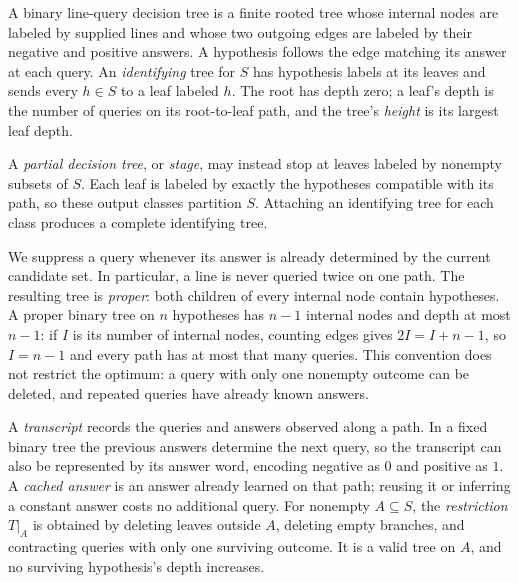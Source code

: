 \begin{definition}\label{def:decision-tree}
A binary line-query decision tree is a finite rooted tree whose
internal nodes are labeled by supplied lines and whose two outgoing
edges are labeled by their negative and positive answers. A
hypothesis follows the edge matching its answer at each query.
An \emph{identifying} tree for $S$ has hypothesis labels at its leaves
and sends every $h\in S$ to a leaf labeled $h$. The root has depth
zero; a leaf's depth is the number of queries on its root-to-leaf path,
and the tree's \emph{height} is its largest leaf depth.

A \emph{partial decision tree}, or \emph{stage}, may instead stop at
leaves labeled by nonempty subsets of $S$. Each leaf is labeled by
exactly the hypotheses compatible with its path, so these output
classes partition $S$. Attaching an identifying tree for each class
produces a complete identifying tree.
\end{definition}

We suppress a query
whenever its answer is already determined by the current candidate
set. In particular, a line is never queried twice on one path.
The resulting tree is \emph{proper}: both children of every internal
node contain hypotheses. A proper binary tree on $n$ hypotheses
has $n-1$ internal nodes and depth at most $n-1$: if $I$ is its
number of internal nodes, counting edges gives $2I=I+n-1$, so
$I=n-1$ and every path has at most that many queries. This convention
does not restrict the optimum: a query with only one nonempty
outcome can be deleted, and repeated queries have already known
answers.

A \emph{transcript} records the queries and answers observed along
a path. In a fixed binary tree the previous answers determine the
next query, so the transcript can also be represented by its answer
word, encoding negative as $0$ and positive as $1$.
A \emph{cached answer} is an answer already learned on that path;
reusing it or inferring a constant answer costs no additional query.
For nonempty $A\subseteq S$, the \emph{restriction} $T|_A$ is obtained
by deleting leaves outside $A$, deleting empty branches, and
contracting queries with only one surviving outcome. It is a valid
tree on $A$, and no surviving hypothesis's depth increases.

